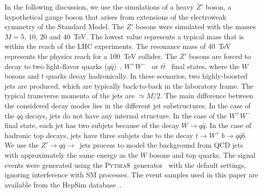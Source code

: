 \documentclass[final,1p,11pt]{elsarticle}
\newcommand{\pythia} {\textsc{Pythia8~}}
\begin{document}
In the following discussion, we use the simulations of a heavy $Z'$ boson, 
a hypothetical gauge boson  that arises from extensions of the electroweak symmetry of the Standard Model.
The $Z'$ bosons were simulated with the masses $M=5$, $10$, $20$ and $40$~TeV. The lowest value 
represents a typical mass that is within the reach of the LHC experiments. The  resonance mass of $40$~TeV 
represents the physics reach for a  100~TeV collider. The $Z'$ bosons are forced to decay to two light-flavor quarks ($q\bar{q}$)~\cite{Langacker:2008yv}, $W^+W^-$~\cite{Leike:1998wr} or $t\bar{t}$~\cite{Rosner:1996eb} final states, where the 
$W$ bosons and $t$ quarks decay hadronically. In these scenarios, two highly-boosted
jets are produced,  which are typically back-to-back in the laboratory frame.
The typical transverse momenta of the jets are $\simeq M/2$.
The main difference between the considered decay modes lies in the different jet substructures. In the case of the $q\bar{q}$ decays,
jets do not have any internal structure. In the case of the $W^+W^-$ final state, each jet has two subjets  because of the decay $W\rightarrow q\bar{q}$. In the case of hadronic top decays, jets have three subjets due
to the decay $t \rightarrow  W^+\>b \rightarrow q\bar{q} b$. We use the $Z' \to q\bar{q} \to$~jets process to model the background from QCD jets with approximately the same energy as 
 the $W$ bosons and top quarks.   
The signal events were generated using the \pythia generator~\cite{Sjostrand:2006za} with the default settings,
ignoring interference with SM processes.
The event samples used in this paper are  available from the
HepSim database~\cite{Chekanov:2014fga}.










\end{document}
